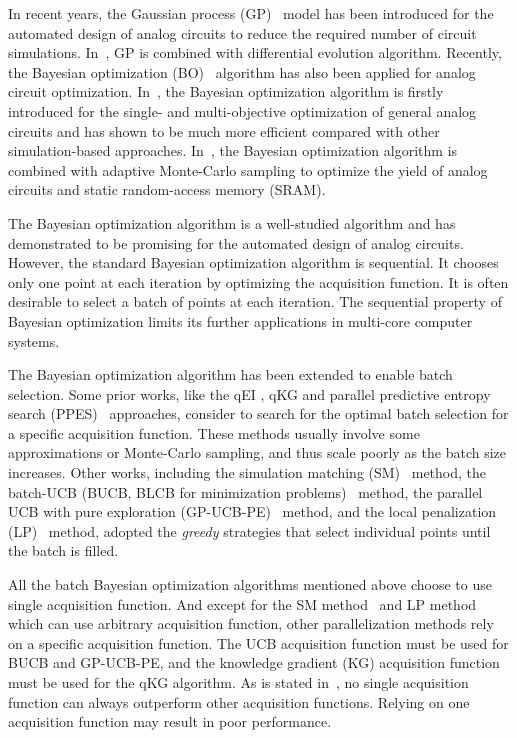 
In recent years, the Gaussian process (GP)~\cite{GPML} model has been
introduced for the automated design of analog circuits to reduce the
required number of circuit simulations. In~\cite{liu2014gaspad}, GP is combined
with differential evolution algorithm. Recently, the Bayesian optimization
(BO)~\cite{shahriari2016taking} algorithm has also been applied for analog
circuit optimization. In~\cite{lyu2017efficient}, the Bayesian optimization
algorithm is firstly introduced for the single- and multi-objective
optimization of general analog circuits and has shown to be much more efficient
compared with other simulation-based approaches. In~\cite{wang2017efficient},
the Bayesian optimization algorithm is combined with adaptive Monte-Carlo
sampling to optimize the yield of analog circuits and static random-access
memory (SRAM).

The Bayesian optimization algorithm is a well-studied algorithm and has
demonstrated to be promising for the automated design of analog circuits.
However, the standard Bayesian optimization algorithm is sequential. It chooses
only one point at each iteration by optimizing the acquisition function. It is
often desirable to select a batch of points at each iteration. The sequential
property of Bayesian optimization limits its further applications in multi-core computer systems.

The Bayesian optimization algorithm has been extended to enable batch
selection. Some prior works, like the qEI \cite{qEI}, qKG \cite{wu2016parallel}
and parallel predictive entropy search (PPES)~\cite{shah2015parallel}
approaches, consider to search for the optimal batch selection for a specific
acquisition function. These methods usually involve some approximations or
Monte-Carlo sampling, and thus scale poorly as the batch size increases. Other
works, including the simulation matching (SM)~\cite{azimi2010batch} method, the
batch-UCB (BUCB, BLCB for minimization
problems)~\cite{desautels2014parallelizing} method, the parallel UCB with pure
exploration (GP-UCB-PE)~\cite{contal2013parallel} method, and the local
penalization (LP)~\cite{gonzalez2016batch} method, adopted the \emph{greedy}
strategies that select individual points until the batch is filled.

All the batch Bayesian optimization algorithms mentioned above choose to use single acquisition function.
And except for the SM method~\cite{azimi2010batch} and LP method~\cite{gonzalez2016batch} which can use arbitrary acquisition
function, other parallelization methods rely on a specific acquisition
function. The UCB acquisition function must be used for BUCB and GP-UCB-PE, and
the knowledge gradient (KG) acquisition function must be used for the qKG algorithm. As is stated
in~\cite{hoffman2011portfolio}, no single acquisition function can always
outperform other acquisition functions. Relying on one acquisition function may
result in poor performance.

